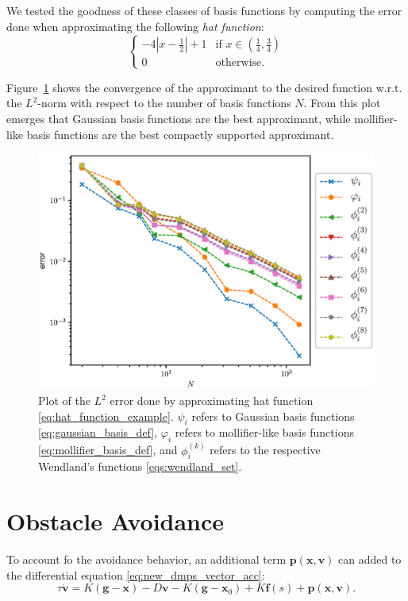 \documentclass[fleqn, 11pt]{article}
\theoremstyle{definition}
\theoremstyle{plain}
\theoremstyle{remark}
\begin{document}
We tested the goodness of these classes of basis functions by computing the error done when approximating the following \emph{hat function}:
\begin{equation}
    \begin{cases}
        - 4 \left| x - \frac{1}{2} \right| + 1 & \text{if }x \in \left( \frac{1}{4}, \frac{3}{4}  \right) \\
        0                               & \text{otherwise}.
    \end{cases}
    \label{eq:hat_function_example}
\end{equation}

Figure~\ref{fig:basis_function_comparison} shows the convergence of the approximant to the desired function w.r.t. the $L^2$-norm with respect to the number of basis functions $N$.
From this plot emerges that Gaussian basis functions are the best approximant, while mollifier-like basis functions are the best compactly supported approximant.

\begin{figure}[t]
    \centering
    \includegraphics[width = 0.5 \linewidth]{imgs/test_basis_functions.eps}
    \caption{Plot of the $L^2$ error done by approximating hat function \eqref{eq:hat_function_example}.
    $ \psi_i $ refers to Gaussian basis functions \eqref{eq:gaussian_basis_def}, $ \varphi_i $ refers to mollifier-like basis functions \eqref{eq:mollifier_basis_def}, and $ \phi_i^{(k)} $ refers to the respective Wendland's functions \eqref{eqs:wendland_set}.}
    \label{fig:basis_function_comparison}
\end{figure}

\section{Obstacle Avoidance}

To account fo the avoidance behavior, an additional term $ \mathbf{p} ( \mathbf{x}, \mathbf{v}) $ can added to the differential equation \eqref{eq:new_dmps_vector_acc}:
\begin{equation}
    \tau \dot{\mathbf{v}} = K(\mathbf{g}-\mathbf{x}) - D\mathbf{v} - K(\mathbf{g} - \mathbf{x}_0) + K \mathbf{f}(s) + \mathbf{p}(\mathbf{x}, \mathbf{v}).
    \label{eq:dmp_obst_avoid_acc}
\end{equation}
\end{document}
